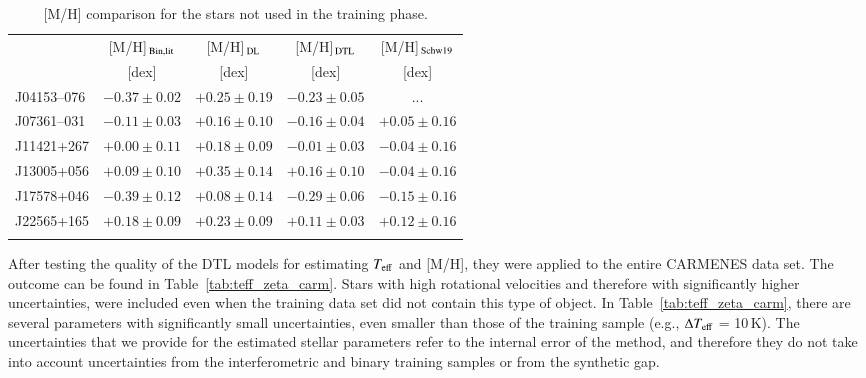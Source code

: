\documentclass{aa}
\begin{document}
\begin{table}[]
\caption{[M/H] comparison for the stars not used in the training phase.}
\label{tab:zeta_uncert}
\centering %
\begin{adjustbox}{width=0.49\textwidth}
\begin{tabular}{l cccc}
    \hline 
    \hline 
    \noalign{\smallskip}
\multicolumn{1}{c}{Karmn} & \multicolumn{1}{c}{[M/H]$_{\rm\,Bin,lit}$} & \multicolumn{1}{c}{[M/H]$_{\rm\,DL}$} & \multicolumn{1}{c}{[M/H]$_{\rm\,DTL}$} & 
\multicolumn{1}{c}{[M/H]$_{\rm\,Schw19}$} \\
 & [dex] & [dex] & [dex] & [dex]\\
\noalign{\smallskip}
\hline
\noalign{\smallskip}
J04153--076  & $-0.37 \pm 0.02$ & $+0.25 \pm 0.19$ & $-0.23 \pm 0.05$ & ... \\
J07361--031  & $-0.11 \pm 0.03$ & $+0.16 \pm 0.10$ & $-0.16 \pm 0.04$ & $+0.05 \pm 0.16$ \\
J11421+267  & $+0.00 \pm 0.11$ & $+0.18 \pm 0.09$ & $-0.01 \pm 0.03$ & $-0.04 \pm 0.16$ \\
J13005+056  & $+0.09 \pm 0.10$ & $+0.35 \pm 0.14$ & $+0.16 \pm 0.10$ & $-0.04 \pm 0.16$ \\
J17578+046  & $-0.39 \pm 0.12$ & $+0.08 \pm 0.14$ & $-0.29 \pm 0.06$ & $-0.15 \pm 0.16$ \\
J22565+165  & $+0.18 \pm 0.09$ & $+0.23 \pm 0.09$ & $+0.11 \pm 0.03$ & $+0.12 \pm 0.16$ \\
\noalign{\smallskip}
\hline
\end{tabular}
\end{adjustbox}
\end{table}

After testing the quality of the DTL models for estimating $T_{\rm eff}$ and [M/H], they were applied to the entire CARMENES data set. The outcome can be found in Table~\ref{tab:teff_zeta_carm}.
Stars with high rotational velocities {and therefore} with significantly higher uncertainties, were included even when the training data set did not contain this type of object.
In Table~\ref{tab:teff_zeta_carm}, there are several parameters with significantly small uncertainties, even smaller than those of the training sample (e.g., $\Delta T_{\rm eff}$ = 10\,K).
The uncertainties that we provide for the estimated stellar parameters refer to the internal error of the method, and therefore they do not take into account uncertainties from the interferometric and binary training samples or from the synthetic gap.
\end{document}
